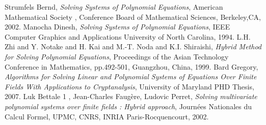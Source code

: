 \documentclass[11pt]{article}
\begin{document}
\begin{thebibliography}{1}
  Strumfels Bernd,
  \textit{Solving Systems of Polynomial Equations},
   American Mathematical Society , Conference Board of Mathematical Sciences,
   Berkeley,CA,
   2002.
  Manocha Dinesh,
  \textit{Solving Systems of Polynomial Equations},
   IEEE Computer Graphics and Applications
   University of North Carolina,
   1994.
  L.H. Zhi and Y. Notake and H. Kai and M.-T. Noda and K.I. Shiraishi,
  \textit{Hybrid Method for Solving Polynomial Equations},
   Proceedings of the Asian Technology Conference in Mathematics, pp.492-501, Guangzhou, China, 1999.
  Bard Gregory,
  \textit{Algorithms for Solving Linear and Polynomial Systems of Equations Over Finite Fields With Applications to Cryptanalysis},
   University of Maryland PHD Thesis,
   2007.
  Luk Bettale 1 , Jean-Charles Faugère, Ludovic Perret,
  \textit{Solving multivariate polynomial systems over finite fields : Hybrid approach},
   Journées Nationales du Calcul Formel,
   UPMC, CNRS, INRIA Paris-Rocquencourt,
   2002.


\end{thebibliography}
\end{document}
